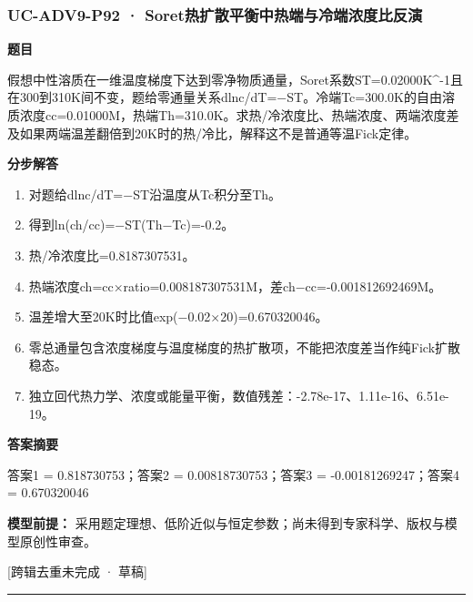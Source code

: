 \documentclass[UTF8,11pt,a4paper]{ctexart}
\begin{document}
\subsubsection*{UC-ADV9-P92 · Soret热扩散平衡中热端与冷端浓度比反演}
\noindent\textbf{题目}\par
假想中性溶质在一维温度梯度下达到零净物质通量，Soret系数ST=0.02000K\textasciicircum{}-1且在300到310K间不变，题给零通量关系dlnc/dT=−ST。冷端Tc=300.0K的自由溶质浓度cc=0.01000M，热端Th=310.0K。求热/冷浓度比、热端浓度、两端浓度差及如果两端温差翻倍到20K时的热/冷比，解释这不是普通等温Fick定律。\par
\medskip\noindent\textbf{分步解答}
\begin{enumerate}
\item 对题给dlnc/dT=−ST沿温度从Tc积分至Th。
\item 得到ln(ch/cc)=−ST(Th−Tc)=-0.2。
\item 热/冷浓度比=0.8187307531。
\item 热端浓度ch=cc×ratio=0.008187307531M，差ch−cc=-0.001812692469M。
\item 温差增大至20K时比值exp(−0.02×20)=0.670320046。
\item 零总通量包含浓度梯度与温度梯度的热扩散项，不能把浓度差当作纯Fick扩散稳态。
\item 独立回代热力学、浓度或能量平衡，数值残差：-2.78e-17、1.11e-16、6.51e-19。
\end{enumerate}
\noindent\textbf{答案摘要}\par
答案1 = 0.818730753；答案2 = 0.00818730753；答案3 = -0.00181269247；答案4 = 0.670320046\par
\noindent\textbf{模型前提：}
采用题定理想、低阶近似与恒定参数；尚未得到专家科学、版权与模型原创性审查。\par
\noindent\textcolor{red!65!black}{[跨辑去重未完成 · 草稿]} \par
\medskip\hrule\medskip
{}
\end{document}
